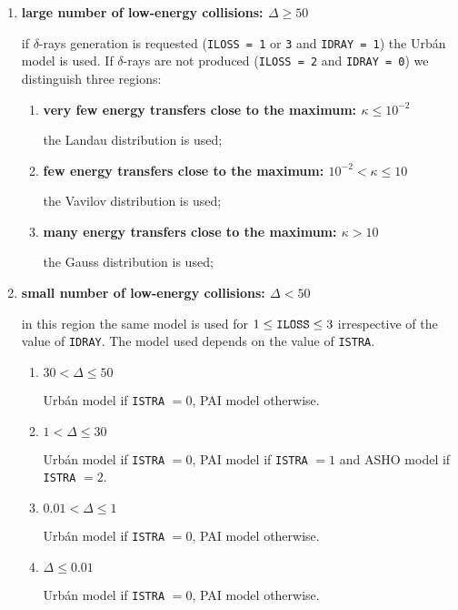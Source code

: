 \begin{enumerate}
\item {\bf large number of low-energy collisions: $\Delta \geq 50$}

if $\delta$-rays generation is requested ({\tt ILOSS = 1} or {\tt 3} and 
{\tt IDRAY = 1}) the Urb\'{a}n model is used. If $\delta$-rays are not
produced ({\tt ILOSS = 2} and {\tt IDRAY = 0}) we distinguish three regions:
\begin{enumerate}
\item {\bf very few energy transfers close to the 
maximum: $\kappa \leq 10^{-2}$}

the Landau distribution is used;

\item {\bf few energy transfers close to the 
maximum: $10^{-2} < \kappa \leq 10$}

the Vavilov distribution is used;

\item {\bf many energy transfers close to the 
maximum: $\kappa > 10$}

the Gauss distribution is used;

\end{enumerate}

\item {\bf small number of low-energy collisions: $ \Delta < 50$}

in this region the same model is used for $1 \leq \mbox{\tt ILOSS}
\leq 3$ irrespective of the value of {\tt IDRAY}.
The model used depends on the value of {\tt ISTRA}.

\begin{enumerate}
\item {\bf $ 30 < \Delta \leq 50$}

Urb\'{a}n model if {\tt ISTRA} $= 0$, PAI model otherwise.

\item {\bf $ 1 < \Delta \leq 30$}

Urb\'{a}n model if {\tt ISTRA} $= 0$, PAI model if {\tt ISTRA}
$=1$ and ASHO model if {\tt ISTRA} $=2$.

\item {\bf $ 0.01 < \Delta \leq 1$}

Urb\'{a}n model if {\tt ISTRA} $= 0$, PAI model otherwise.

\item {\bf $ \Delta \leq 0.01$}

Urb\'{a}n model if {\tt ISTRA} $=0$, PAI model otherwise.

\end{enumerate}
\end{enumerate}

